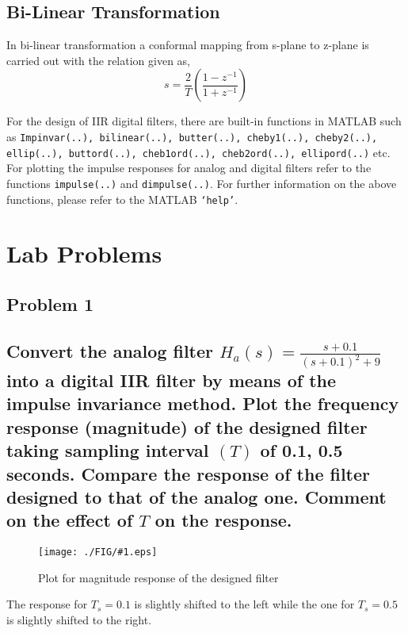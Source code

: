 \documentclass[a4paper,11pt]{article}
\newcommand\ddfrac[2]{\frac{\displaystyle #1}{\displaystyle #2}}
\newcommand{\mobs}[2]{
    \begin{figure}[H]
        \centering
        \texttt{[image: ./FIG/\#1.eps]}
        \caption{#2}
    \end{figure}
   
}
\begin{document}
\subsection{Bi-Linear Transformation}
In bi-linear transformation a conformal mapping from s-plane to z-plane is carried out with the relation given as,
\begin{equation*}
    s=\frac{2}{T}\left(\frac{1-z^{-1}}{1+z^{-1}}\right)
\end{equation*}

For the design of IIR digital filters, there are built-in functions in MATLAB such as \texttt{Impinvar(..),
    bilinear(..), butter(..), cheby1(..), cheby2(..), ellip(..), buttord(..), cheb1ord(..), cheb2ord(..),
    ellipord(..)} etc. For plotting the impulse responses for analog and digital filters refer to the
functions \texttt{impulse(..)} and \texttt{dimpulse(..)}.  For further information on the above functions, please refer to the MATLAB \texttt{‘help’}.


\section {Lab Problems}


\subsection{Problem 1}



\subsection*{Convert the analog filter $H_a(s)=\ddfrac{s+0.1}{(s+0.1)^2+9}$ into a digital IIR filter by means of the impulse invariance method. Plot the frequency response (magnitude) of the designed filter taking sampling interval $(T)$ of 0.1, 0.5 seconds. Compare the response of the filter designed to that of the analog one. Comment on the effect of $T$ on the response.}

\mobs{p1}{Plot for magnitude response of the designed filter}

The response for $T_s=0.1$ is slightly shifted  to the left while the one for $T_s=0.5$ is slightly shifted to the right.


\end{document}
